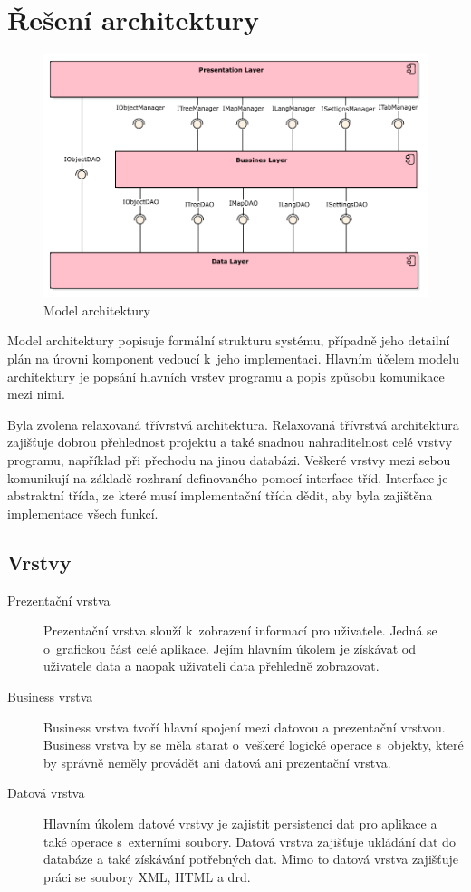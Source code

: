\documentclass[thesis=B,czech]{resources/FITthesis}[2012/06/26]
\begin{document}
	\section{Řešení architektury}
\begin{figure}\centering
	\includegraphics[width=1\textwidth]{images/architektura}
	\caption[Model architektury]{Model architektury}\label{fig:architektura}
\end{figure}
Model architektury popisuje formální strukturu systému, případně jeho detailní plán na úrovni komponent vedoucí k~jeho implementaci. Hlavním účelem modelu architektury je popsání hlavních vrstev programu a popis způsobu komunikace mezi nimi.\par

Byla zvolena relaxovaná třívrstvá architektura. Relaxovaná třívrstvá architektura zajišťuje dobrou přehlednost projektu a také snadnou nahraditelnost celé vrstvy programu, například při přechodu na jinou databázi. Veškeré vrstvy mezi sebou komunikují na základě rozhraní definovaného pomocí interface tříd. Interface je abstraktní třída, ze které musí implementační třída dědit, aby byla zajištěna implementace všech funkcí.

\subsection{Vrstvy}
\begin{description}
	\item[Prezentační vrstva] Prezentační vrstva slouží k~zobrazení informací pro uživatele. Jedná se o~grafickou část celé aplikace. Jejím hlavním úkolem je získávat od uživatele data a naopak uživateli data přehledně zobrazovat. 
	
	\item[Business vrstva] Business vrstva tvoří hlavní spojení mezi datovou a prezentační vrstvou. Business vrstva by se měla starat o~veškeré logické operace s~objekty, které by správně neměly provádět ani datová ani prezentační vrstva.
	
	\item[Datová vrstva] Hlavním úkolem datové vrstvy je zajistit persistenci dat pro aplikace a také operace s~externími soubory. Datová vrstva zajišťuje ukládání dat do databáze a také získávání potřebných dat. Mimo to datová vrstva zajišťuje práci se soubory XML, HTML a drd. 
	
\end{description}
\end{document}
